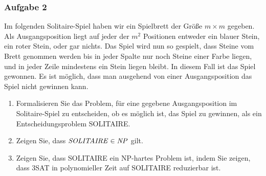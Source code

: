 \subsubsection*{Aufgabe 2}
    Im folgenden Solitaire-Spiel haben wir ein Spielbrett der Größe $m \times m$ gegeben. Als Ausgangsposition liegt auf jeder der $m^{2}$ Positionen entweder ein blauer Stein, ein roter Stein, oder gar nichts. Das Spiel wird nun so gespielt, dass Steine vom Brett genommen werden bis in jeder Spalte nur noch Steine einer Farbe liegen, und in jeder Zeile mindestens ein Stein liegen bleibt. In diesem Fall ist das Spiel gewonnen. Es ist möglich, dass man ausgehend von einer Ausgangsposition das Spiel nicht gewinnen kann.
    \begin{enumerate}
        \item Formalisieren Sie das Problem, für eine gegebene Ausgangsposition im Solitaire-Spiel zu entscheiden, ob es möglich ist, das Spiel zu gewinnen, als ein Entscheidungsproblem SOLITAIRE.
        \item Zeigen Sie, dass $\mathit{SOLITAIRE} \in \mathit{NP}$ gilt.
        \item Zeigen Sie, dass SOLITAIRE ein NP-hartes Problem ist, indem Sie zeigen, dass 3SAT in polynomieller Zeit auf SOLITAIRE reduzierbar ist.
    \end{enumerate}

